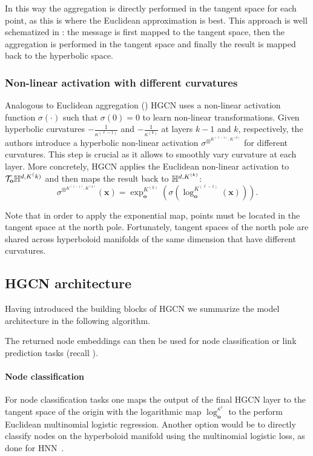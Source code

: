 In this way the aggregation is directly performed in the tangent space for each point, as this is where the Euclidean approximation is best. This approach is well schematized in : the message is first mapped to the tangent space, then the aggregation is performed in the tangent space and finally the result is mapped back to the hyperbolic space.



\subsubsection{Non-linear activation with different curvatures}
Analogous to Euclidean aggregation () HGCN uses a non-linear activation function $\sigma(\cdot)$ such that $\sigma(0)=0$ to learn non-linear transformations. Given hyperbolic curvatures $-\frac{1}{\kappa^{(\ell-1)}}$ and $-\frac{1}{\kappa^{(k)}}$ at layers $k-1$ and $k$, respectively, the authors introduce a hyperbolic non-linear activation $\sigma^{\otimes^{K^{(\ell-1)}, K^{(k)}}}$ for different curvatures. This step is crucial as it allows to smoothly vary curvature at each layer. More concretely, HGCN applies the Euclidean non-linear activation to $\mathcal{T}_\mathbf{o}\mathbb{H}^{d,K^(k)}$ and then maps the result back to $\mathbb{H}^{d,K^{(k)}}$:
\begin{equation*}
    \sigma^{\otimes^{K^{(\ell-1)}, K^{(k)}}}(\mathbf{x}) = \exp_{\mathbf{o}}^{K^{(k)}}\left(\sigma\left(\log_{\mathbf{o}}^{K^{(\ell-1)}}(\mathbf{x})\right)\right).
\end{equation*}

Note that in order to apply the exponential map, points must be located in the tangent space at the north pole. Fortunately, tangent spaces of the north pole are shared across hyperboloid manifolds of the same dimension that have different curvatures.

\subsection{HGCN architecture}
Having introduced the building blocks of HGCN we summarize the model architecture in the following algorithm.

The returned node embeddings can then be used for node classification or link prediction tasks (recall ).

\paragraph{Node classification}
For node classification tasks one maps the output of the final HGCN layer to the tangent space of the origin with the logarithmic map $\log_\mathbf{o}^{\kappa^\ell}$ to the perform Euclidean multinomial logistic regression. Another option would be to directly classify nodes on the hyperboloid manifold using the multinomial logistic loss, as done for HNN~\cite{ganea2018HNN}.

